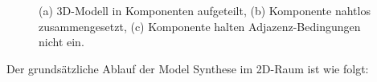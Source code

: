 \documentclass[12pt, a4paper,twoside,openright]{report} %
\begin{document}
\begin{figure}[H]
    \centering
    \qquad
    \qquad
    \caption{(a) 3D-Modell in Komponenten aufgeteilt, (b) Komponente nahtlos zusammengesetzt, (c) Komponente halten Adjazenz-Bedingungen nicht ein. \cite{merrell2009model}}%
\end{figure}

Der grundsätzliche Ablauf der Model Synthese im 2D-Raum ist wie folgt:
\end{document}
